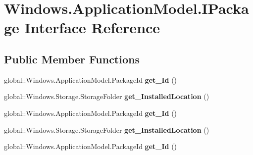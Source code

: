 \hypertarget{interface_windows_1_1_application_model_1_1_i_package}{}\section{Windows.\+Application\+Model.\+I\+Package Interface Reference}
\label{interface_windows_1_1_application_model_1_1_i_package}
\subsection*{Public Member Functions}
\begin{DoxyCompactItemize}
\item 
\mbox{\label{interface_windows_1_1_application_model_1_1_i_package_ae11185e898bfdbaf22592088c8aa95d9}} 
global\+::\+Windows.\+Application\+Model.\+Package\+Id {\bfseries get\+\_\+\+Id} ()
\item 
\mbox{\label{interface_windows_1_1_application_model_1_1_i_package_ada43e61f2329b8abc4a43de9f9eb5bd3}} 
global\+::\+Windows.\+Storage.\+Storage\+Folder {\bfseries get\+\_\+\+Installed\+Location} ()
\item 
\mbox{\label{interface_windows_1_1_application_model_1_1_i_package_ae11185e898bfdbaf22592088c8aa95d9}} 
global\+::\+Windows.\+Application\+Model.\+Package\+Id {\bfseries get\+\_\+\+Id} ()
\item 
\mbox{\label{interface_windows_1_1_application_model_1_1_i_package_ada43e61f2329b8abc4a43de9f9eb5bd3}} 
global\+::\+Windows.\+Storage.\+Storage\+Folder {\bfseries get\+\_\+\+Installed\+Location} ()
\item 
\mbox{\label{interface_windows_1_1_application_model_1_1_i_package_ae11185e898bfdbaf22592088c8aa95d9}} 
global\+::\+Windows.\+Application\+Model.\+Package\+Id {\bfseries get\+\_\+\+Id} ()
\item 
\mbox{\label{interface_windows_1_1_application_model_1_1_i_package_ada43e61f2329b8abc4a43de9f9eb5bd3}} 

\end{DoxyCompactItemize}
